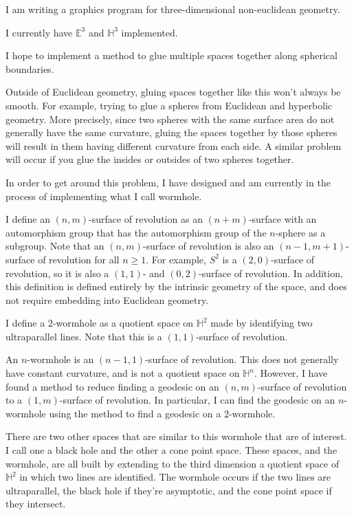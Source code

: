 \documentclass[12pt]{amsart}
\begin{document}
I am writing a graphics program for three-dimensional non-euclidean geometry.

I currently have $\mathbb{E}^3$ and $\mathbb{H}^3$ implemented.

I hope to implement a method to glue multiple spaces together along spherical boundaries.

Outside of Euclidean geometry, gluing spaces together like this won't always be smooth. For example, trying to glue a spheres from Euclidean and hyperbolic geometry. More precisely, since two spheres with the same surface area do not generally have the same curvature, gluing the spaces together by those spheres will result in them having different curvature from each side. A similar problem will occur if you glue the insides or outsides of two spheres together.

In order to get around this problem, I have designed and am currently in the process of implementing what I call wormhole.

I define an $(n,m)$-surface of revolution as an $(n+m)$-surface with an automorphism group that has the automorphism group of the $n$-sphere as a subgroup. Note that an $(n,m)$-surface of revolution is also an $(n-1,m+1)$-surface of revolution for all $n \geq 1$. For example, $S^2$ is a $(2,0)$-surface of revolution, so it is also a $(1,1)$- and $(0,2)$-surface of revolution. In addition, this definition is defined entirely by the intrinsic geometry of the space, and does not require embedding into Euclidean geometry.


I define a $2$-wormhole as a quotient space on $\mathbb{H}^2$ made by identifying two ultraparallel lines. Note that this is a $(1,1)$-surface of revolution.

An $n$-wormhole is an $(n-1,1)$-surface of revolution. This does not generally have constant curvature, and is not a quotient space on $\mathbb{H}^n$. However, I have found a method to reduce finding a geodesic on an $(n,m)$-surface of revolution to a $(1,m)$-surface of revolution. In particular, I can find the geodesic on an $n$-wormhole using the method to find a geodesic on a $2$-wormhole.

There are two other spaces that are similar to this wormhole that are of interest. I call one a black hole and the other a cone point space. These spaces, and the wormhole, are all built by extending to the third dimension a quotient space of $\mathbb{H}^2$ in which two lines are identified. The wormhole occurs if the two lines are ultraparallel, the black hole if they're asymptotic, and the cone point space if they intersect.
\end{document}
